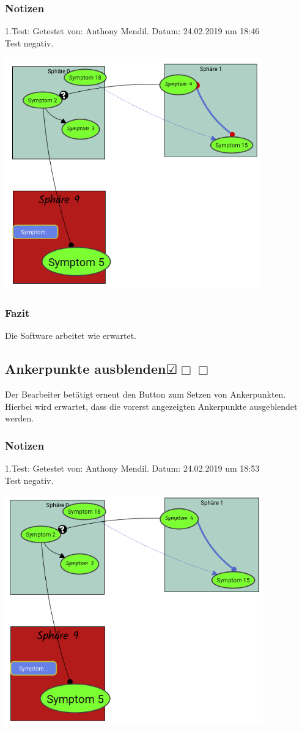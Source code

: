 \documentclass{scrartcl}
\newcommand{\subsectiont}[2]{\subsection[#1]{#1{\normalsize\normalfont #2}}}
\newcommand{\leer}{$\Box$}
\newcommand{\ok}{$\CheckedBox$}
\begin{document}
\subsubsection{Notizen}
1.Test: Getestet von: Anthony Mendil. Datum: 24.02.2019 um 18:46 \\
Test negativ. 
\begin{center}
\includegraphics[height=10cm]{3_37.PNG}
\end{center}
\subsubsection{Fazit}
Die Software arbeitet wie erwartet.

\subsectiont{Ankerpunkte ausblenden}{\dotfill\ok\leer\leer}
Der Bearbeiter betätigt erneut den Button zum Setzen von Ankerpunkten. Hierbei wird erwartet, dass die vorerst angezeigten Ankerpunkte ausgeblendet werden. 
\subsubsection{Notizen}
1.Test: Getestet von: Anthony Mendil. Datum: 24.02.2019 um 18:53 \\
Test negativ. 
\begin{center}
\includegraphics[height=10cm]{3_38.PNG}
\end{center}
\end{document}
